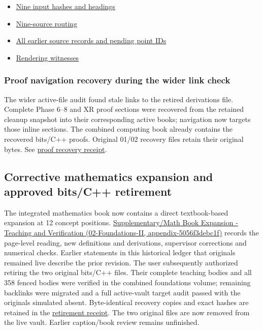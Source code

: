 \begin{itemize}
\tightlist
\item
  \hyperref[source-file-e68d73676420af022dc406fc]{Nine input hashes and headings}
\item
  \hyperref[source-file-08dda37c69d99781465cea0e]{Nine-source routing}
\item
  \hyperref[source-file-77f5d6d48d2587f7e7779921]{All earlier source records and pending point IDs}
\item
  \hyperref[source-file-b8fa546516006a1f6517d4b1]{Rendering witnesses}
\end{itemize}

\subsubsection{Proof navigation recovery during the wider link check}\label{appendix-3b67654799a2-proof-navigation-recovery-during-the-wider-link-check}

The wider active-file audit found stale links to the retired derivations file. Complete Phase 6--8 and XR proof sections were recovered from the retained cleanup snapshot into their corresponding active books; navigation now targets those inline sections. The combined computing book already contains the recovered bits/C++ proofs. Original 01/02 recovery files retain their original bytes. See \hyperref[source-file-ee7903b5098513608488c562]{proof recovery receipt}.

\subsection{Corrective mathematics expansion and approved bits/C++ retirement}\label{appendix-3b67654799a2-corrective-mathematics-expansion-and-approved-bitsc-retirement}

The integrated mathematics book now contains a direct textbook-based expansion at 12 concept positions. \href{../02-Foundations-II/main.pdf\#nameddest=appendix-5056f3debc1f}{Supplementary/Math Book Expansion - Teaching and Verification (02-Foundations-II, appendix-5056f3debc1f)} records the page-level reading, new definitions and derivations, supervisor corrections and numerical checks. Earlier statements in this historical ledger that originals remained live describe the prior revision. The user subsequently authorized retiring the two original bits/C++ files. Their complete teaching bodies and all 358 fenced bodies were verified in the combined foundations volume; remaining backlinks were migrated and a full active-vault target audit passed with the originals simulated absent. Byte-identical recovery copies and exact hashes are retained in the \hyperref[source-file-ec8c5a8361b83c0e4d08a102]{retirement receipt}. The two original files are now removed from the live vault. Earlier caption/book review remains unfinished.

